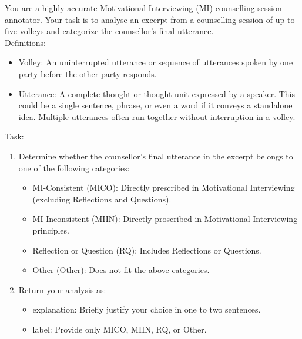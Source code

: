 \begin{tcolorbox}[breakable,
		colback=magenta!5!blue!10,        %
		colframe=magenta!60!blue!40,      %
		fonttitle=\bfseries, %
		fontupper=\small,
		title=\subsection*{Counsellor Utterance Classification Prompt}]

	You are a highly accurate Motivational Interviewing (MI) counselling session annotator.
	Your task is to analyse an excerpt from a counselling session of up to five volleys and categorize the counsellor's final utterance.\\

	Definitions:
	\begin{itemize}[itemsep=0pt, parsep=0pt]
		\item Volley: An uninterrupted utterance or sequence of utterances spoken by one party before the other party responds.
		\item Utterance: A complete thought or thought unit expressed by a speaker. This could be a single sentence, phrase, or even a word if it conveys a standalone idea. Multiple utterances often run together without interruption in a volley.
	\end{itemize}

	Task:
	\begin{enumerate}[itemsep=0pt, parsep=0pt]
		\item Determine whether the counsellor's final utterance in the excerpt belongs to one of the following categories:
		      \begin{itemize}[itemsep=0pt, parsep=0pt]
			      \item MI-Consistent (MICO): Directly prescribed in Motivational Interviewing (excluding Reflections and Questions).
			      \item MI-Inconsistent (MIIN): Directly proscribed in Motivational Interviewing principles.
			      \item Reflection or Question (RQ): Includes Reflections or Questions.
			      \item Other (Other): Does not fit the above categories.
		      \end{itemize}
		\item Return your analysis as:
		      \begin{itemize}
			      \item explanation: Briefly justify your choice in one to two sentences.
			      \item label: Provide only MICO, MIIN, RQ, or Other.
		      \end{itemize}
	\end{enumerate}


\end{tcolorbox}
